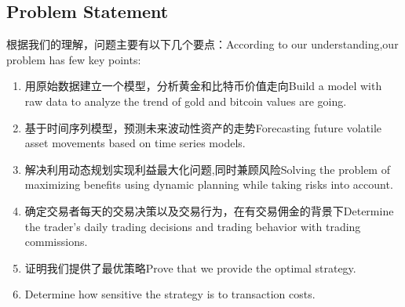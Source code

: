 \documentclass{mcmthesis}
\begin{document}
\subsection{Problem Statement}
根据我们的理解，问题主要有以下几个要点：According to our understanding,our problem has few key points:
\begin{enumerate}    %
  \item 用原始数据建立一个模型，分析黄金和比特币价值走向Build a model with raw data to analyze the trend of gold and bitcoin values are going.
  \item 基于时间序列模型，预测未来波动性资产的走势Forecasting future volatile asset movements based on time series models.
  \item 解决利用动态规划实现利益最大化问题,同时兼顾风险Solving the problem of maximizing benefits using dynamic planning while taking risks into account.
  \item 确定交易者每天的交易决策以及交易行为，在有交易佣金的背景下Determine the trader's daily trading decisions and trading behavior with trading commissions.
  \item 证明我们提供了最优策略Prove that we provide the optimal strategy.
  \item Determine how sensitive the strategy is to transaction costs.
\end{enumerate}
\end{document}
